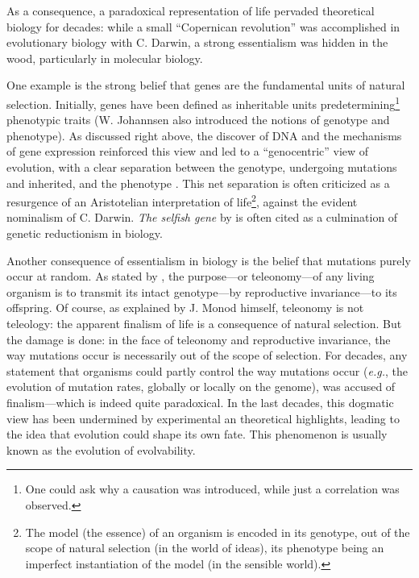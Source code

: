 As a consequence, a paradoxical representation of life pervaded theoretical biology for decades: while a small ``Copernican revolution'' was accomplished in evolutionary biology with C. Darwin, a strong essentialism was hidden in the wood, particularly in molecular biology.

One example is the strong belief that genes are the fundamental units of natural selection. Initially, genes have been defined as inheritable units predetermining\footnote{One could ask why a causation was introduced, while just a correlation was observed.} phenotypic traits \citep{johannsen-1911} (W. Johannsen also introduced the notions of genotype and phenotype). As discussed right above, the discover of DNA and the mechanisms of gene expression reinforced this view and led to a ``genocentric'' view of evolution, with a clear separation between the genotype, undergoing mutations and inherited, and the phenotype \citep{rivoire-and-leibler-2014}. This net separation is often criticized as a resurgence of an Aristotelian interpretation of life\footnote{The model (the essence) of an organism is encoded in its genotype, out of the scope of natural selection (in the world of ideas), its phenotype being an imperfect instantiation of the model (in the sensible world).}, against the evident nominalism of C. Darwin. \textit{The selfish gene} by \cite{dawkins-1976} is often cited as a culmination of genetic reductionism in biology.

Another consequence of essentialism in biology is the belief that mutations purely occur at random. As stated by \cite{monod-1970}, the purpose---or teleonomy---of any living organism is to transmit its intact genotype---by reproductive invariance---to its offspring. Of course, as explained by J. Monod himself, teleonomy is not teleology: the apparent finalism of life is a consequence of natural selection. But the damage is done: in the face of teleonomy and reproductive invariance, the way mutations occur is necessarily out of the scope of selection. For decades, any statement that organisms could partly control the way mutations occur (\textit{e.g.}, the evolution of mutation rates, globally or locally on the genome), was accused of finalism---which is indeed quite paradoxical. In the last decades, this dogmatic view has been undermined by experimental an theoretical highlights, leading to the idea that evolution could shape its own fate. This phenomenon is usually known as the evolution of evolvability.


